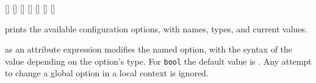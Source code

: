 \begin{isabellebody}
\begin{isamarkuptext}
  \begin{railoutput}
[]
\rail@bar
{}
[]
\rail@bar
{}[]
[]
[]
[]
[]
\rail@endbar
\rail@endbar
\rail@end
\end{railoutput}


  \begin{description}
  
  \item \hyperlink{command.print-configs}{\mbox{}} prints the available configuration
  options, with names, types, and current values.
  
  \item {} as an attribute expression modifies the
  named option, with the syntax of the value depending on the option's
  type.  For \verb|bool| the default value is .  Any
  attempt to change a global option in a local context is ignored.


\end{description}
\end{isamarkuptext}
\end{isabellebody}
